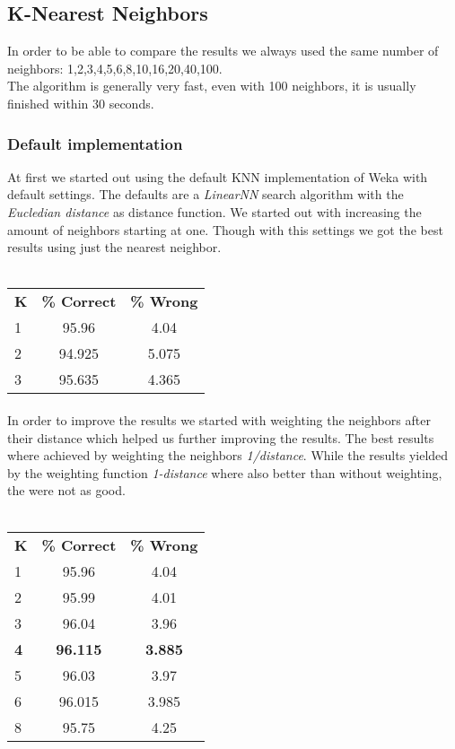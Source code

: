 \documentclass{sig-alternate-05-2015}
\begin{document}
\subsection{K-Nearest Neighbors}
In order to be able to compare the results we always used the same number of neighbors: 1,2,3,4,5,6,8,10,16,20,40,100.\\
The algorithm is generally very fast, even with 100 neighbors, it is usually finished within 30 seconds. 
\subsubsection{Default implementation}
At first we started out using the default KNN implementation of Weka with default settings. The defaults are a \emph{LinearNN} search algorithm with the \emph{Eucledian distance} as distance function. We started out with increasing the amount of neighbors starting at one. Though with this settings we got the best results using just the nearest neighbor. 
\\\\
\begin{tabular}{ l | c |c }
\textbf{K} & \textbf{\% Correct} & \textbf{\% Wrong} \\
1 & 95.96 & 4.04 \\
2 & 94.925 & 5.075 \\
3 & 95.635 & 4.365 \\
\end{tabular}
\paragraph{}In order to improve the results we started with weighting the neighbors after their distance which helped us further improving the results. The best results where achieved by weighting the neighbors \emph{1/distance}. While the results yielded by the weighting function \emph{1-distance} where also better than without weighting, the were not as good.
\\\\
\begin{tabular}{ l | c | c }
\textbf{K} & \textbf{\% Correct} & \textbf{\% Wrong} \\
1 & 95.96 & 4.04 \\
2 & 95.99& 4.01\\
3 & 96.04 & 3.96 \\
\textbf{4} & \textbf{96.115} & \textbf{3.885} \\
5 & 96.03 & 3.97 \\
6 & 96.015 & 3.985 \\
8 & 95.75 & 4.25 \\
\end{tabular}
\end{document}
